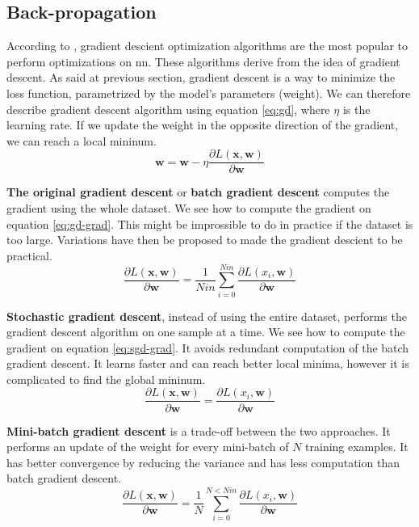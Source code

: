 \subsection{Back-propagation} \label{subs:trainbackward}
According to \textcite{ruder_overview_2017}, gradient descient optimization algorithms are the most popular to perform optimizations on \acrshort{nn}. These algorithms derive from the idea of gradient descent. As said at previous section, gradient descent is a way to minimize the loss function, parametrized by the model's parameters (weight). We can therefore describe gradient descent algorithm using equation \eqref{eq:gd}, where $\eta$ is the learning rate. If we update the weight in the opposite direction of the gradient, we can reach a local mininum.
%
\begin{equation}
    \boldsymbol{w} = \boldsymbol{w} - \eta \frac{ \partial L( \boldsymbol{x}, \boldsymbol{w} ) }{\partial \boldsymbol{w}}
    \label{eq:gd}
\end{equation}

\textbf{The original gradient descent} or \textbf{batch gradient descent }computes the gradient using the whole dataset. We see how to compute the gradient on equation \eqref{eq:gd-grad}. This might be improssible to do in practice if the dataset is too large. Variations have then be proposed to made the gradient descient to be practical.
%
\begin{equation}
    \frac{ \partial L( \boldsymbol{x}, \boldsymbol{w} ) }{\partial \boldsymbol{w}} = \frac{1}{Nin} \sum^{Nin}_{i = 0} \frac{ \partial L( x_i, \boldsymbol{w} ) }{\partial \boldsymbol{w}}
    \label{eq:gd-grad}
\end{equation}

\textbf{Stochastic gradient descent}, instead of using the entire dataset, performs the gradient descent algorithm on one sample at a time. We see how to compute the gradient on equation \eqref{eq:sgd-grad}. It avoids redundant computation of the batch gradient descent. It learns faster and can reach better local minima, however it is complicated to find the global mininum.
%
\begin{equation}
    \frac{ \partial L( \boldsymbol{x}, \boldsymbol{w} ) }{\partial \boldsymbol{w}} = \frac{ \partial L( x_i, \boldsymbol{w} ) }{\partial \boldsymbol{w}}
    \label{eq:sgd-grad}
\end{equation}

\textbf{Mini-batch gradient descent} is a trade-off between the two approaches. It performs an update of the weight for every mini-batch of $N$ training examples. It has better convergence  by reducing the variance and has less computation than batch gradient descent.
%
\begin{equation}
    \frac{ \partial L( \boldsymbol{x}, \boldsymbol{w} ) }{\partial \boldsymbol{w}} = \frac{1}{N} \sum^{N < Nin}_{i = 0} \frac{ \partial L( x_i, \boldsymbol{w} ) }{\partial \boldsymbol{w}}
    \label{eq:bgd-grad}
\end{equation}
